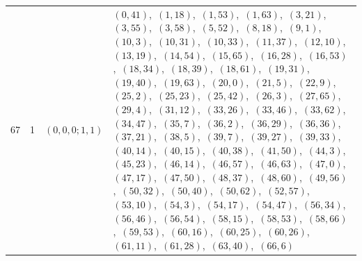 \documentclass[11pt]{article}
\begin{document}
\begin{longtable}{@{}rrl>{\raggedright\arraybackslash}p{}@{}}
67 & 1 & $(0,0,0;1,1)$ & $(0,41)$,\allowbreak\ $(1,18)$,\allowbreak\ $(1,53)$,\allowbreak\ $(1,63)$,\allowbreak\ $(3,21)$,\allowbreak\ $(3,55)$,\allowbreak\ $(3,58)$,\allowbreak\ $(5,52)$,\allowbreak\ $(8,18)$,\allowbreak\ $(9,1)$,\allowbreak\ $(10,3)$,\allowbreak\ $(10,31)$,\allowbreak\ $(10,33)$,\allowbreak\ $(11,37)$,\allowbreak\ $(12,10)$,\allowbreak\ $(13,19)$,\allowbreak\ $(14,54)$,\allowbreak\ $(15,65)$,\allowbreak\ $(16,28)$,\allowbreak\ $(16,53)$,\allowbreak\ $(18,34)$,\allowbreak\ $(18,39)$,\allowbreak\ $(18,61)$,\allowbreak\ $(19,31)$,\allowbreak\ $(19,40)$,\allowbreak\ $(19,63)$,\allowbreak\ $(20,0)$,\allowbreak\ $(21,5)$,\allowbreak\ $(22,9)$,\allowbreak\ $(25,2)$,\allowbreak\ $(25,23)$,\allowbreak\ $(25,42)$,\allowbreak\ $(26,3)$,\allowbreak\ $(27,65)$,\allowbreak\ $(29,4)$,\allowbreak\ $(31,12)$,\allowbreak\ $(33,26)$,\allowbreak\ $(33,46)$,\allowbreak\ $(33,62)$,\allowbreak\ $(34,47)$,\allowbreak\ $(35,7)$,\allowbreak\ $(36,2)$,\allowbreak\ $(36,29)$,\allowbreak\ $(36,36)$,\allowbreak\ $(37,21)$,\allowbreak\ $(38,5)$,\allowbreak\ $(39,7)$,\allowbreak\ $(39,27)$,\allowbreak\ $(39,33)$,\allowbreak\ $(40,14)$,\allowbreak\ $(40,15)$,\allowbreak\ $(40,38)$,\allowbreak\ $(41,50)$,\allowbreak\ $(44,3)$,\allowbreak\ $(45,23)$,\allowbreak\ $(46,14)$,\allowbreak\ $(46,57)$,\allowbreak\ $(46,63)$,\allowbreak\ $(47,0)$,\allowbreak\ $(47,17)$,\allowbreak\ $(47,50)$,\allowbreak\ $(48,37)$,\allowbreak\ $(48,60)$,\allowbreak\ $(49,56)$,\allowbreak\ $(50,32)$,\allowbreak\ $(50,40)$,\allowbreak\ $(50,62)$,\allowbreak\ $(52,57)$,\allowbreak\ $(53,10)$,\allowbreak\ $(54,3)$,\allowbreak\ $(54,17)$,\allowbreak\ $(54,47)$,\allowbreak\ $(56,34)$,\allowbreak\ $(56,46)$,\allowbreak\ $(56,54)$,\allowbreak\ $(58,15)$,\allowbreak\ $(58,53)$,\allowbreak\ $(58,66)$,\allowbreak\ $(59,53)$,\allowbreak\ $(60,16)$,\allowbreak\ $(60,25)$,\allowbreak\ $(60,26)$,\allowbreak\ $(61,11)$,\allowbreak\ $(61,28)$,\allowbreak\ $(63,40)$,\allowbreak\ $(66,6)$\\

\end{longtable}
\end{document}
